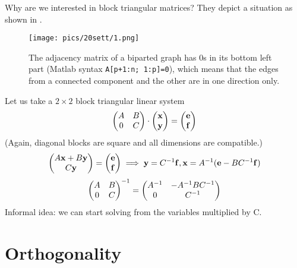 \documentclass[computationalMathematics.tex]{subfiles}
\begin{document}
Why are we interested in block triangular matrices? They depict a situation as shown in .
\begin{figure}[H]
    \centering
    \texttt{[image: pics/20sett/1.png]}
    \caption{The adjacency matrix of a biparted graph has $0$s in its bottom left part (Matlab syntax \texttt{A[p+1:n; 1:p]=0}), which means that the edges from a connected component and the other are in one direction only.}\label{fig:20sett3}
\end{figure}


\begin{example}\label{exp1:20sett}
Let us take a $2\times2$ block triangular linear system\\
  \[
\begin{pmatrix}
    A & B\\
    0 & C
\end{pmatrix}
\cdot
\begin{pmatrix}
    {\bf x } \\
    {\bf y } 
\end{pmatrix} = 
\begin{pmatrix}
    {\bf e } \\
    {\bf f } 
\end{pmatrix}
\]
(Again, diagonal blocks are square and all dimensions are
compatible.)
  \[
\begin{pmatrix}
    A{\bf x } + B{\bf y }\\
    C{\bf y }
\end{pmatrix} = 
\begin{pmatrix}
    {\bf e } \\
    {\bf f } 
\end{pmatrix}\implies {\bf y } = {C}^{-1}{\bf f }, {\bf x } = {A}^{-1}({\bf e } - B{C}^{-1}{\bf f })
\]
  \[
\begin{pmatrix}
    A & B\\
    0 & C
\end{pmatrix}^{-1} = 
\begin{pmatrix}
          {A}^{-1} & -{A}^{-1}B{C}^{-1}\\
          0 & {C}^{-1}
        \end{pmatrix}
      \]
Informal idea: we can start solving from the variables multiplied by C.
\end{example}

\section{Orthogonality}
\end{document}
